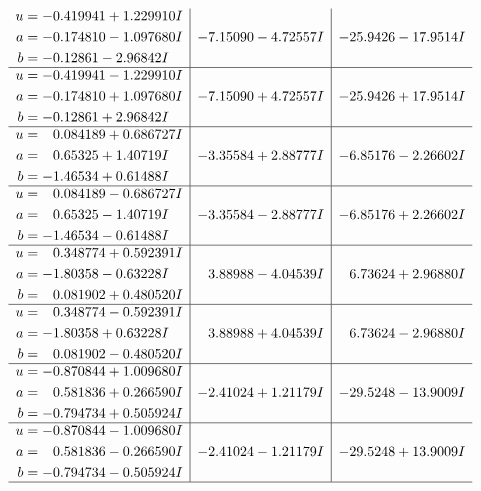 \documentclass[1p]{elsarticle_modified}
\theoremstyle{definition}
\begin{document}
$$\begin{array}{c|c|c}
\begin{aligned}
u &= -0.419941 + 1.229910 I \\
a &= -0.174810 - 1.097680 I \\
b &= -0.12861 - 2.96842 I\end{aligned}
 & -7.15090 - 4.72557 I & -25.9426 - 17.9514 I \\ \hline\begin{aligned}
u &= -0.419941 - 1.229910 I \\
a &= -0.174810 + 1.097680 I \\
b &= -0.12861 + 2.96842 I\end{aligned}
 & -7.15090 + 4.72557 I & -25.9426 + 17.9514 I \\ \hline\begin{aligned}
u &= \phantom{-}0.084189 + 0.686727 I \\
a &= \phantom{-}0.65325 + 1.40719 I \\
b &= -1.46534 + 0.61488 I\end{aligned}
 & -3.35584 + 2.88777 I & -6.85176 - 2.26602 I \\ \hline\begin{aligned}
u &= \phantom{-}0.084189 - 0.686727 I \\
a &= \phantom{-}0.65325 - 1.40719 I \\
b &= -1.46534 - 0.61488 I\end{aligned}
 & -3.35584 - 2.88777 I & -6.85176 + 2.26602 I \\ \hline\begin{aligned}
u &= \phantom{-}0.348774 + 0.592391 I \\
a &= -1.80358 - 0.63228 I \\
b &= \phantom{-}0.081902 + 0.480520 I\end{aligned}
 & \phantom{-}3.88988 - 4.04539 I & \phantom{-}6.73624 + 2.96880 I \\ \hline\begin{aligned}
u &= \phantom{-}0.348774 - 0.592391 I \\
a &= -1.80358 + 0.63228 I \\
b &= \phantom{-}0.081902 - 0.480520 I\end{aligned}
 & \phantom{-}3.88988 + 4.04539 I & \phantom{-}6.73624 - 2.96880 I \\ \hline\begin{aligned}
u &= -0.870844 + 1.009680 I \\
a &= \phantom{-}0.581836 + 0.266590 I \\
b &= -0.794734 + 0.505924 I\end{aligned}
 & -2.41024 + 1.21179 I & -29.5248 - 13.9009 I \\ \hline\begin{aligned}
u &= -0.870844 - 1.009680 I \\
a &= \phantom{-}0.581836 - 0.266590 I \\
b &= -0.794734 - 0.505924 I\end{aligned}
 & -2.41024 - 1.21179 I & -29.5248 + 13.9009 I\\
 \hline 
 \end{array}$$\newpage
\end{document}
